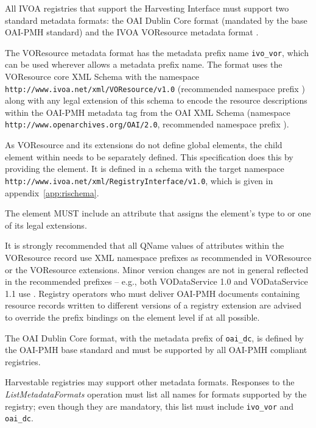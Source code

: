 \documentclass{ivoa}
\newcommand{\oaiop}[1]{\textit{#1}}
\begin{document}
\label{sect:metadataformats}

All IVOA registries that support the Harvesting Interface must support
two standard metadata formats: the OAI Dublin Core format (mandated by
the base OAI-PMH standard) and the IVOA VOResource metadata format
\citep{std:VOR}.

The VOResource metadata format has the metadata prefix name
\texttt{ivo\_vor}, which can be used wherever \citet{std:OAIPMH} allows a
metadata prefix name.  The format uses the VOResource core XML Schema
with the namespace 
\texttt{http://www.ivoa.net/xml/VOResource/v1.0}
(recommended namespace prefix ) along with any legal
extension of this schema to encode the resource descriptions within the
OAI-PMH metadata tag from the OAI XML Schema (namespace
\texttt{http://www.openarchives.org/OAI/2.0}, recommended namespace
prefix ). 

As VOResource and its extensions do not define global elements, the
child element within  needs to be separately
defined.  This specification does this by providing the
 element.  It is defined in a schema with the target
namespace
\nolinkurl{http://www.ivoa.net/xml/RegistryInterface/v1.0}, which is given
in appendix~\ref{app:rischema}.

The
 element MUST include an  attribute
that assigns the element's type to  or one of its
legal extensions.

It is strongly recommended that all QName values of 
attributes within the VOResource record use XML namespace prefixes as
recommended in VOResource or the VOResource extensions.  Minor version
changes are not in general reflected in the recommended prefixes --
e.g., both VODataService 1.0 and VODataService 1.1 use .
Registry operators
who must deliver OAI-PMH documents containing resource records written
to different versions of a registry extension are advised to
override the prefix
bindings on the element level if at all possible.

The OAI Dublin Core format, with the metadata prefix of \texttt{oai\_dc},
is defined by the OAI-PMH base standard and must be supported by all
OAI-PMH compliant registries.

Harvestable registries may support other metadata formats. Responses to
the
\oaiop{ListMeta\-dataFormats} operation 
must list all names for formats supported
by the registry; even though they are mandatory, this list must include
\texttt{ivo\_vor} and \texttt{oai\_dc}.
\end{document}

